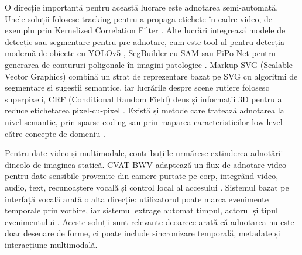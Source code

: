 O direcție importantă pentru această lucrare este adnotarea semi-automată. Unele soluții folosesc tracking pentru a propaga etichete în cadre video, de exemplu prin Kernelized Correlation Filter \cite{8457958}. Alte lucrări integrează modele de detecție sau segmentare pentru pre-adnotare, cum este tool-ul pentru detecția modernă de obiecte cu YOLOv5 \cite{10579415}, SegBuilder cu SAM \cite{10943988} sau PiPo-Net pentru generarea de contururi poligonale în imagini patologice \cite{9636146}. Markup SVG (Scalable Vector Graphics) combină un strat de reprezentare bazat pe SVG cu algoritmi de segmentare și sugestii semantice, iar lucrările despre scene rutiere folosesc superpixeli, CRF (Conditional Random Field) dens și informații 3D pentru a reduce etichetarea pixel-cu-pixel \cite{5940230,7995759}. Există și metode care tratează adnotarea la nivel semantic, prin sparse coding sau prin maparea caracteristicilor low-level către concepte de domeniu \cite{6359013,4476645}.

Pentru date video și multimodale, contribuțiile urmăresc extinderea adnotării dincolo de imaginea statică. CVAT-BWV adaptează un flux de adnotare video pentru date sensibile provenite din camere purtate pe corp, integrând video, audio, text, recunoaștere vocală și control local al accesului \cite{ijcai2024p1006}. Sistemul bazat pe interfață vocală arată o altă direcție: utilizatorul poate marca evenimente temporale prin vorbire, iar sistemul extrage automat timpul, actorul și tipul evenimentului \cite{11274710}. Aceste soluții sunt relevante deoarece arată că adnotarea nu este doar desenare de forme, ci poate include sincronizare temporală, metadate și interacțiune multimodală.

